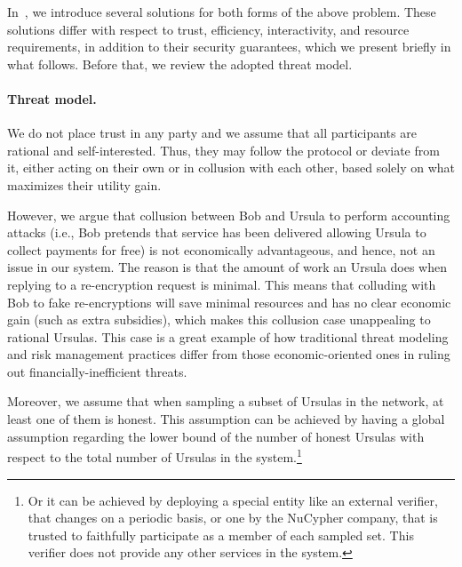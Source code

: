 \documentclass{llncs}
\begin{document}
 In~\cite{confirm-activity-draft}, we introduce several solutions for both forms of the above problem. These solutions differ with respect to trust, efficiency, interactivity, and resource requirements, in addition to their security guarantees, which we present briefly in what follows. Before that, we review the adopted threat model.


\paragraph{Threat model.} We do not place trust in any party and we assume that all participants are rational and self-interested. Thus, they may follow the protocol or deviate from it, either acting on their own or in collusion with each other, based solely on what maximizes their utility gain. 


However, we argue that collusion between Bob and Ursula to perform accounting attacks (i.e., Bob pretends that service has been delivered allowing Ursula to collect payments for free) is not economically advantageous, and hence, not an issue in our system. The reason is that the amount of work an Ursula does when replying to a re-encryption request is minimal. This means that colluding with Bob to fake re-encryptions will save minimal resources and has no clear economic gain (such as extra subsidies), which makes this collusion case unappealing to rational Ursulas. This case is a great example of how traditional threat modeling and risk management practices differ from those economic-oriented ones in ruling out financially-inefficient threats.


Moreover, we assume that when sampling a subset of Ursulas in the network, at least one of them is honest. This assumption can be achieved by having a global assumption regarding the lower bound of the number of 
honest Ursulas with respect to the total number of Ursulas in the system.\footnote{Or it can be achieved by deploying a special entity like an external verifier, that changes on a periodic basis, or one by the NuCypher company, that is trusted to faithfully participate as a member of each sampled set. This verifier does not provide any other services in the system.}
\end{document}
